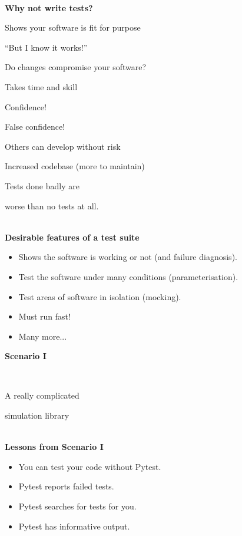 \documentclass[12pt]{article}
\newlength{\geometrytop}
\newcommand{\slidetitle}[1]{~\\[-0.5ex]{\Large\bf{\color{bold}#1}}\\}
\begin{document}
\slidetitle{Why {\color{red}not} write tests?}
\begin{itemize}[itemsep=-2.9pt]
\item Shows your software is fit for purpose
{\color{red} \item[\label={}] \hfill ``But I know it works!''}
\item Do changes compromise your software?
{\color{red} \item[\label={}] \hfill Takes time and skill}
\item Confidence!
{\color{red} \item[\label={}] \hfill False confidence!}
\item Others can develop without risk
{\color{red} \item[\label={}] \hfill Increased codebase (more to maintain)}
\end{itemize}
\clearpage

\thispagestyle{plain}
\vspace*{-\topskip}
\vspace*{\fill}
{\LARGE\centerline{Tests done badly are}
\centerline{worse than no tests at all.}}
\vspace*{\fill}
\vspace*{\geometrytop}
\clearpage


\slidetitle{Desirable features of a test suite}
\begin{itemize}
\item Shows the software is working or not (and failure diagnosis).
\item Test the software under many conditions (parameterisation).
\item Test areas of software in isolation (mocking).
\item Must run fast!
\item Many more...
\end{itemize}
\clearpage

\thispagestyle{plain}
\vspace*{-\topskip}
\vspace*{\fill}
{\Huge\centerline{\textbf{Scenario I}}~\newline
\centerline{A really complicated}
\centerline{simulation library}}
\vspace*{\fill}
\vspace*{\geometrytop}
\clearpage

\slidetitle{Lessons from Scenario I}
\begin{itemize}
\item You can test your code without Pytest.
\item Pytest reports failed tests.
\item Pytest searches for tests for you.
\item Pytest has informative output.
\end{itemize}
\clearpage
\end{document}
